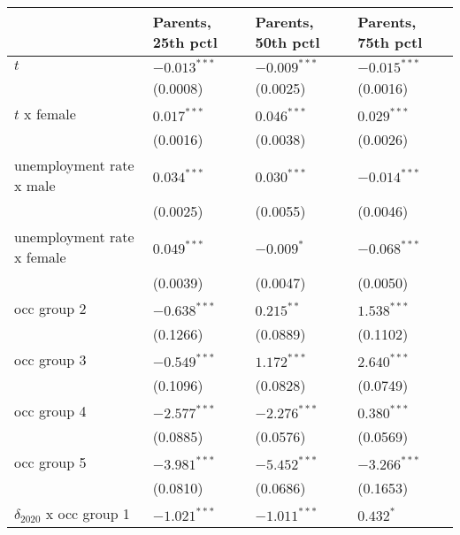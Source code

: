 \begin{tabular}{llll}
\toprule
{} & Parents, 25th pctl & Parents, 50th pctl & Parents, 75th pctl \\
\midrule
$t$                                    &     $-0.013^{***}$ &     $-0.009^{***}$ &     $-0.015^{***}$ \\
                                       &           (0.0008) &           (0.0025) &           (0.0016) \\
$t$ x female                           &      $0.017^{***}$ &      $0.046^{***}$ &      $0.029^{***}$ \\
                                       &           (0.0016) &           (0.0038) &           (0.0026) \\
unemployment rate x male               &      $0.034^{***}$ &      $0.030^{***}$ &     $-0.014^{***}$ \\
                                       &           (0.0025) &           (0.0055) &           (0.0046) \\
unemployment rate x female             &      $0.049^{***}$ &         $-0.009^*$ &     $-0.068^{***}$ \\
                                       &           (0.0039) &           (0.0047) &           (0.0050) \\
occ group 2                            &     $-0.638^{***}$ &       $0.215^{**}$ &      $1.538^{***}$ \\
                                       &           (0.1266) &           (0.0889) &           (0.1102) \\
occ group 3                            &     $-0.549^{***}$ &      $1.172^{***}$ &      $2.640^{***}$ \\
                                       &           (0.1096) &           (0.0828) &           (0.0749) \\
occ group 4                            &     $-2.577^{***}$ &     $-2.276^{***}$ &      $0.380^{***}$ \\
                                       &           (0.0885) &           (0.0576) &           (0.0569) \\
occ group 5                            &     $-3.981^{***}$ &     $-5.452^{***}$ &     $-3.266^{***}$ \\
                                       &           (0.0810) &           (0.0686) &           (0.1653) \\
$\delta_{2020}$ x occ group 1          &     $-1.021^{***}$ &     $-1.011^{***}$ &          $0.432^*$ \\

\end{tabular}
